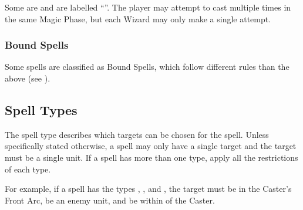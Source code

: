 Some \learnedspells{} are \replicablespells{} and are labelled \enquote{\textit{\textbf{\replicablespellnumber}}}. The player may attempt to cast \replicablespells{} multiple times in the same Magic Phase, but each Wizard may only make a single attempt.

\subsubsection{Bound Spells}
\label{bound_spells_classification}

Some spells are classified as Bound Spells, which follow different rules than the above (see ).

\subsection{Spell Types}
\label{spell_types}

The spell type describes which targets can be chosen for the spell. Unless specifically stated otherwise, a spell may only have a single target and the target must be a single unit. If a spell has more than one type, apply all the restrictions of each type.

For example, if a spell has the types \direct{}, \hex{}, and , the target must be in the Caster's Front Arc, be an enemy unit, and be within  of the Caster.

